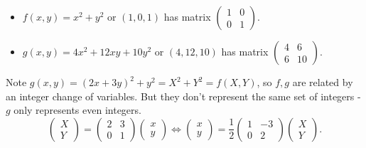 \documentclass{article}
\begin{document}
\begin{eg}
    \begin{itemize}
        \item $f(x, y) = x^2 + y^2$ or $(1, 0, 1)$ has matrix
            $\begin{pmatrix}1 & 0 \\ 0 & 1\end{pmatrix}$.
        \item $g(x, y) = 4 x^2 + 12 xy + 10y^2$ or $(4, 12, 10)$ has matrix
            $\begin{pmatrix}4 & 6 \\ 6 & 10\end{pmatrix}$.

    \end{itemize}
    Note $g(x, y) = (2 x + 3 y)^2 + y^2 = X^2 + Y^2 = f(X, Y)$, so $f, g$ are related by an integer change of variables.
    But they don't represent the same set of integers - $g$ only represents even integers.
    \begin{equation*}
        \begin{pmatrix}
            X \\ Y
        \end{pmatrix}
        =
        \begin{pmatrix}
        2 & 3 \\ 0 & 1
        \end{pmatrix}
        \begin{pmatrix}
            x \\ y
        \end{pmatrix}
        \iff
        \begin{pmatrix}
            x \\ y
        \end{pmatrix}
        = \frac{1}{2}
        \begin{pmatrix}
            1 & -3 \\ 0 & 2
        \end{pmatrix}
        \begin{pmatrix}
            X \\ Y
        \end{pmatrix}.
    \end{equation*}
\end{eg}
\end{document}
